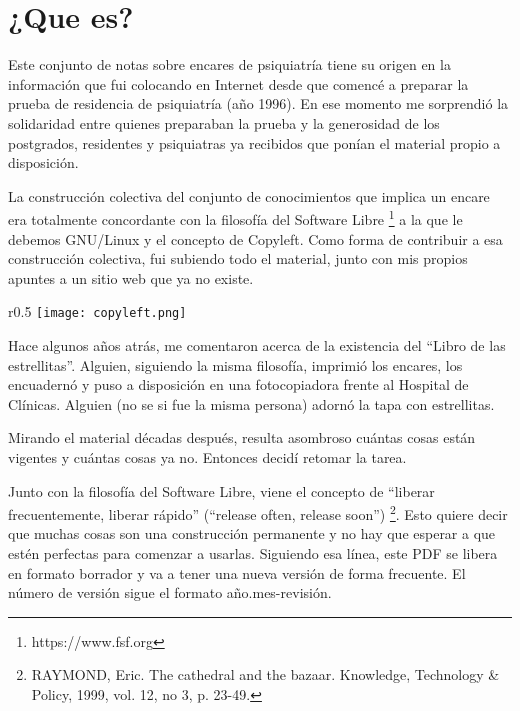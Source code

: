 \chapter{¿Que es?}
Este conjunto de notas sobre encares de psiquiatría tiene su origen en la información que fui colocando en Internet desde que comencé a preparar la prueba de residencia de psiquiatría (año 1996). En ese momento me sorprendió la solidaridad entre quienes preparaban la prueba y la generosidad de los postgrados, residentes y psiquiatras ya recibidos que ponían el material propio a disposición.

La construcción colectiva del conjunto de conocimientos que implica un encare era totalmente concordante con la filosofía del Software Libre \footnote{https://www.fsf.org} a la que le debemos GNU/Linux y el concepto de Copyleft. Como forma de contribuir a esa construcción colectiva, fui subiendo todo el material, junto con mis propios apuntes a un sitio web que ya no existe.

\begin{wrapfigure}{r}{0.5\textwidth}
	\centering
    \texttt{[image: copyleft.png]}
\end{wrapfigure}
Hace algunos años atrás, me comentaron acerca de la existencia del ``Libro de las estrellitas''. Alguien, siguiendo la misma filosofía, imprimió los encares, los encuadernó y puso a disposición en una fotocopiadora frente al Hospital de Clínicas. Alguien (no se si fue la misma persona) adornó la tapa con estrellitas.

Mirando el material décadas después, resulta asombroso cuántas cosas están vigentes y cuántas cosas ya no. Entonces decidí retomar la tarea.

Junto con la filosofía del Software Libre, viene el concepto de ``liberar frecuentemente, liberar rápido'' (``release often, release soon'') \footnote{RAYMOND, Eric. The cathedral and the bazaar. Knowledge, Technology \& Policy, 1999, vol. 12, no 3, p. 23-49.}. Esto quiere decir que muchas cosas son una construcción permanente y no hay que esperar a que estén perfectas para comenzar a usarlas. Siguiendo esa línea, este PDF se libera en formato borrador y va a tener una nueva versión de forma frecuente. El número de versión sigue el formato año.mes-revisión.
